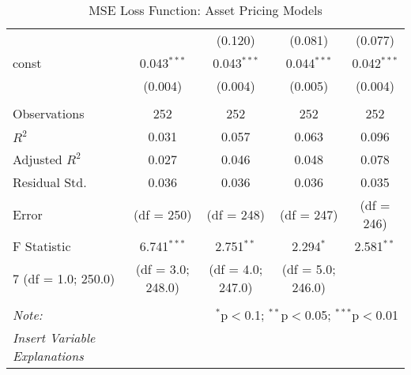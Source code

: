 \begin{table}[H]
\begin{tabular}{@{\extracolsep{5pt}}lcccc}
                        &                                                                                  & (0.120)           & (0.081)           & (0.077)       \\
    const               & 0.043$^{***}$                                                                    & 0.043$^{***}$     & 0.044$^{***}$     & 0.042$^{***}$ \\
                        & (0.004)                                                                          & (0.004)           & (0.005)           & (0.004)       \\
    \hline                                                                                                                                                         \\[-1.8ex]
    Observations        & 252                                                                              & 252               & 252               & 252           \\
    $R^2$               & 0.031                                                                            & 0.057             & 0.063             & 0.096         \\
    Adjusted $R^2$      & 0.027                                                                            & 0.046             & 0.048             & 0.078         \\
    Residual Std.       & 0.036                                                                            & 0.036             & 0.036             & 0.035         \\
    Error               & (df = 250)                                                                       & (df = 248)        & (df = 247)        & (df = 246)    \\
    F Statistic         & 6.741$^{***}$                                                                    & 2.751$^{**}$      & 2.294$^{*}$       & 2.581$^{**}$  \\
    7 (df = 1.0; 250.0) & (df = 3.0; 248.0)                                                                & (df = 4.0; 247.0) & (df = 5.0; 246.0)                 \\
    \hline
    \hline                                                                                                                                                         \\[-1.8ex]
    \textit{Note:}      & \multicolumn{4}{r}{$^{*}$p$<$0.1; $^{**}$p$<$0.05; $^{***}$p$<$0.01}                                                                     \\
    \textit{Insert Variable Explanations}                                                                                                                          \\
  \end{tabular}
  \caption{MSE Loss Function: Asset Pricing Models}
  \label{mse-tf-apm}
\end{table}





